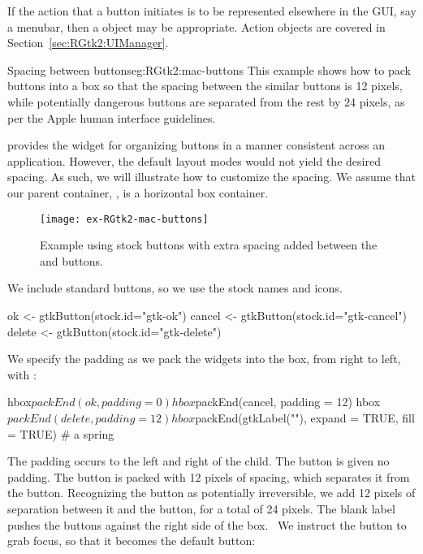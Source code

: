 If the action that a button initiates is to be represented elsewhere
in the GUI, say a menubar, then a  object may be
appropriate. Action objects are covered in
Section~\ref{sec:RGtk2:UIManager}.

\begin{example}{Spacing between buttons}{eg:RGtk2:mac-buttons}
This example shows how to pack buttons into a box so that the spacing
between the similar buttons is 12 pixels, while potentially dangerous
buttons are separated from the rest by 24 pixels, as per the Apple human
interface guidelines.  

\GTK\/ provides the widget  for organizing
buttons in a manner consistent across an application. However, the
default layout modes would not yield the desired spacing. As such, we
will illustrate how to customize the spacing.  We assume that our
parent container, , is a horizontal box container.


\begin{figure}
  \centering
  \texttt{[image: ex-RGtk2-mac-buttons]}
  \caption{Example using stock buttons with extra spacing added between the  and  buttons.}
  \label{fig:ex-RGtk2-mac-buttons}
\end{figure}

We include standard buttons, so we use the stock names and icons.
\begin{Schunk}
\begin{Sinput}
 ok <- gtkButton(stock.id="gtk-ok")
 cancel <- gtkButton(stock.id="gtk-cancel")
 delete <- gtkButton(stock.id="gtk-delete")
\end{Sinput}
\end{Schunk}

We specify the padding as we pack the widgets into the box, from right
to left, with :
\begin{Schunk}
\begin{Sinput}
 hbox$packEnd(ok, padding = 0)
 hbox$packEnd(cancel, padding = 12)
 hbox$packEnd(delete, padding = 12)
 hbox$packEnd(gtkLabel(""), expand = TRUE, fill = TRUE) # a spring
\end{Sinput}
\end{Schunk}
%
The padding occurs to the left and right of the child.  The 
button is given no padding. The  button is packed with 12
pixels of spacing, which separates it from the 
button. Recognizing the  button as potentially
irreversible, we add 12 pixels of separation between it and the
 button, for a total of 24 pixels. The blank label pushes
the buttons against the right side of the box.~  We instruct the
 button to grab focus, so that it becomes the default
button:
\begin{Schunk}
\end{Schunk}






\end{example}

